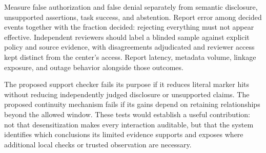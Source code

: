 Measure false authorization and false denial separately from semantic disclosure,
unsupported assertions, task success, and abstention. Report error among decided
events together with the fraction decided: rejecting everything must not appear
effective. Independent reviewers should label a blinded sample against explicit
policy and source evidence, with disagreements adjudicated and reviewer access
kept distinct from the center's access. Report latency, metadata volume, linkage
exposure, and outage behavior alongside those outcomes.

The proposed support checker fails its purpose if it reduces literal marker hits
without reducing independently judged disclosure or unsupported claims. The
proposed continuity mechanism fails if its gains depend on retaining relationships
beyond the allowed window. These tests would establish a useful contribution:
not that desensitization makes every interaction auditable, but that the system
identifies which conclusions its limited evidence supports and exposes where
additional local checks or trusted observation are necessary.
